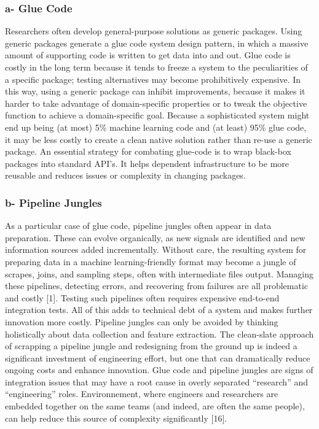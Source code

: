 \documentclass[]{article}
\begin{document}
\subsubsection{a- Glue Code}\label{a--glue-code}

Researchers often develop general-purpose solutions as generic packages.
Using generic packages generate a glue code system design pattern, in
which a massive amount of supporting code is written to get data into
and out. Glue code is costly in the long term because it tends to freeze
a system to the peculiarities of a specific package; testing
alternatives may become prohibitively expensive. In this way, using a
generic package can inhibit improvements, because it makes it harder to
take advantage of domain-specific properties or to tweak the objective
function to achieve a domain-specific goal. Because a sophisticated
system might end up being (at most) 5\% machine learning code and (at
least) 95\% glue code, it may be less costly to create a clean native
solution rather than re-use a generic package. An essential strategy for
combating glue-code is to wrap black-box packages into standard API's.
It helps dependent infrastructure to be more reusable and reduces issues
or complexity in changing packages.

\subsubsection{b- Pipeline Jungles}\label{b--pipeline-jungles}

As a particular case of glue code, pipeline jungles often appear in data
preparation. These can evolve organically, as new signals are identified
and new information sources added incrementally. Without care, the
resulting system for preparing data in a machine learning-friendly
format may become a jungle of scrapes, joins, and sampling steps, often
with intermediate files output. Managing these pipelines, detecting
errors, and recovering from failures are all problematic and costly
{[}1{]}. Testing such pipelines often requires expensive end-to-end
integration tests. All of this adds to technical debt of a system and
makes further innovation more costly. Pipeline jungles can only be
avoided by thinking holistically about data collection and feature
extraction. The clean-slate approach of scrapping a pipeline jungle and
redesigning from the ground up is indeed a significant investment of
engineering effort, but one that can dramatically reduce ongoing costs
and enhance innovation. Glue code and pipeline jungles are signs of
integration issues that may have a root cause in overly separated
``research'' and ``engineering'' roles. Environnement, where engineers
and researchers are embedded together on the same teams (and indeed, are
often the same people), can help reduce this source of complexity
significantly {[}16{]}.
\end{document}
